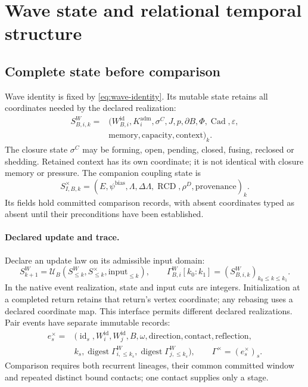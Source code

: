 \section{Wave state and relational temporal structure}
\label{sec:wave-state-relational-time}

\subsection{Complete state before comparison}
Wave identity is fixed by \eqref{eq:wave-identity}. Its mutable state retains
all coordinates needed by the declared realization:
\begin{equation}
\begin{split}
S^W_{B,i,k}={}&(W^{\mathrm{id}}_{B,i},K^{\mathrm{adm}}_i,
\sigma^C,J,p,\partial B,\Phi,\operatorname{Cad},\varepsilon,\\
&\mathrm{memory},\mathrm{capacity},\mathrm{context})_k.
\end{split}
\label{eq:complete-wave-state}
\end{equation}
The closure state \(\sigma^C\) may be forming, open, pending, closed, fusing,
reclosed or shedding. Retained context has its own coordinate; it is not
identical with closure memory or pressure. The companion coupling state is
\begin{equation}
S^\times_{I,B,k}=
(E,\psi^{\mathrm{bias}},\Lambda,\Delta\Lambda,
\operatorname{RCD},\rho^D,\mathrm{provenance})_k.
\label{eq:complete-coupling-state}
\end{equation}
Its fields hold committed comparison records, with absent coordinates typed
as absent until their preconditions have been established.

\paragraph{Declared update and trace.}
Declare an update law on its admissible input domain:
\begin{equation}
S^W_{k+1}=\mathcal U_B(S^W_{\le k},S^\times_{\le k},\mathrm{input}_{\le k}),
\qquad
\Gamma^W_{B,i}[k_0{:}k_1]=(S^W_{B,i,k})_{k_0\le k\le k_1}.
\label{eq:wave-update-trace}
\end{equation}
In the native event realization, state and input cuts are integers. Initialization
at a completed return retains that return's vertex coordinate; any rebasing uses
a declared coordinate map.
This interface permits different declared realizations. Pair events have
separate immutable records:
\begin{equation}
\begin{split}
e_s^\times={}&(\operatorname{id}_s,W_i^{\mathrm{id}},W_j^{\mathrm{id}},
B,\omega,\mathrm{direction},\mathrm{contact},\mathrm{reflection},\\
&k_s,\operatorname{digest}\Gamma^W_{i,\le k_s},
\operatorname{digest}\Gamma^W_{j,\le k_s}),
\qquad \Gamma^\times=(e_s^\times)_s.
\end{split}
\label{eq:coupling-trace}
\end{equation}
Comparison requires both recurrent lineages, their common committed window
and repeated distinct bound contacts; one contact supplies only a stage.

